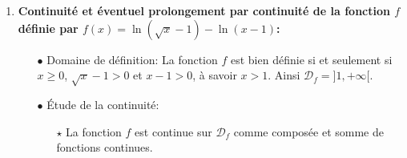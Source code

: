 \documentclass[a4paper, 11pt,reqno]{article}
\begin{document}
\begin{correction}
\begin{enumerate}
\begin{itemize}
\begin{itemize}
				                  \noindent Par les \'equivalents usuels: $\ln{(1+x)}\underset{0}{\thicksim} x$, $e^{2x^2}-1\underset{0}{\thicksim} 2x^2$ par substitution et par produit et quotient d'\'equivalents: $f_2(x) \underset{0}{\thicksim} \ddp\frac{|x|}{2x}$. Ainsi $\lim\limits_{x\to 0^+} f(x)=\ddp\demi$ et $\lim\limits_{x\to 0^-} f(x)=-\ddp\demi$. Les deux limites ne sont pas \'egales et ainsi il n'existe pas de limite en 0. Donc la fonction $f$ n'est pas prolongeable par continuit\'e en 0. Par contre elle est prolongeable par continuit\'e \`{a} droite en 0 en posant: $f(x)=\left\lbrace \begin{array}{ll}   \ddp\frac{x\ln{(1+x)}}{e^{2x^2}-1} & \hbox{si}\ x>0\vsec\\ \ddp\demi & \hbox{si}\ x=0.  \end{array}\right.$ Et elle est aussi prolongeable par continuit\'e \`{a} gauche en 0 en posant: $f(x)=\left\lbrace \begin{array}{ll}   \ddp\frac{-x\ln{(1+x)}}{e^{2x^2}-1} & \hbox{si}\ -1<x<0\vsec\\ -\ddp\demi & \hbox{si}\ x=0.  \end{array}\right.$
				            \item[$\star$] \'Etude d'un \'eventuel prolongement par continuit\'e en $-1$: on a: $\lim\limits_{x\to -1} f_2(x)=-\infty$ par propri\'et\'e sur les compos\'ee, somme, produit et quotient de limites. Ainsi $f$ n'est pas prolongeable par continuit\'e en $-1$ et $\mathcal{C}_{f}$ admet une asymptote verticale d'\'equation $x=-1$.
			            \end{itemize}
		      \end{itemize}
		\item \textbf{Continuit\'e et \'eventuel prolongement par continuit\'e de la fonction $f$ d\'efinie par $f(x)= \ln{\left(\sqrt{x}-1 \right)}-\ln{(x-1)}$:}
		      \begin{itemize}
			      \item[$\bullet$] Domaine de d\'efinition: La fonction $f$ est bien d\'efinie si et seulement si $x\geq 0$, $\sqrt{x}-1>0$ et $x-1>0$, \`{a} savoir $x>1$. Ainsi $\mathcal{D}_{f}=\rbrack 1,+\infty\lbrack$.
			      \item[$\bullet$] \'Etude de la continuit\'e:
			            \begin{itemize}
				            \item[$\star$] La fonction $f$ est continue sur $\mathcal{D}_{f}$ comme compos\'ee et somme de fonctions continues.

\end{itemize}
\end{itemize}
\end{enumerate}
\end{correction}
\end{document}
